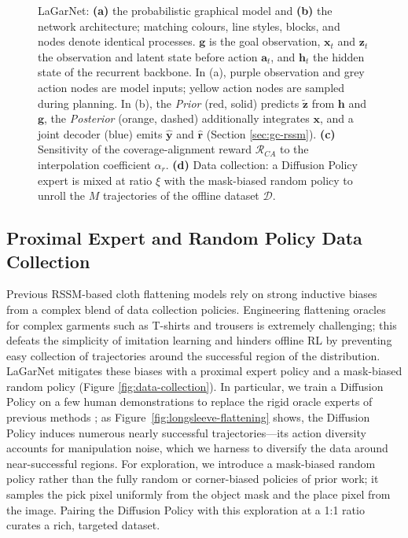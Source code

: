 \documentclass[journal]{IEEEtran}
\newif\ifshowrev\showrevtrue
\newcommand{\rev}[1]{\ifshowrev\textcolor{revblue}{#1}\else#1\fi}
\newif\ifshowrrev\showrrevtrue
\newcommand{\rrev}[1]{\ifshowrrev\textcolor{rrevred}{#1}\else#1\fi}
\begin{document}
\begin{figure}[t!]
    \caption{\rev{LaGarNet: \rrev{\textbf{(a)}} the probabilistic graphical model and \rrev{\textbf{(b)}} the network architecture; matching colours, line styles, blocks, and nodes denote identical processes. $\bm{g}$ is the goal observation, $\bm{x}_t$ and $\bm{z}_t$ the observation and latent state before action $\bm{a}_t$, and $\bm{h}_t$ the hidden state of the recurrent backbone. \rrev{In (a), purple observation and grey action nodes are model inputs; yellow action nodes are sampled during planning. In (b), the \textit{Prior} (red, solid) predicts $\boldsymbol{\tilde{z}}$ from $\boldsymbol{h}$ and $\boldsymbol{g}$, the \textit{Posterior} (orange, dashed) additionally integrates $\boldsymbol{x}$, and a joint decoder (blue) emits $\boldsymbol{\hat{y}}$ and $\boldsymbol{\hat{r}}$ (Section \ref{sec:gc-rssm}).} \rrev{\textbf{(c)}} Sensitivity of the coverage-alignment reward $\mathcal{R}_{CA}$ to the interpolation coefficient $\alpha_r$. \rrev{\textbf{(d)}} Data collection: a Diffusion Policy expert is mixed at ratio \rrev{$\xi$} with the mask-biased random policy to unroll the $M$ trajectories of the offline dataset $\mathcal{D}$.}}
    \label{fig:lagarnet}
\end{figure}

\subsection{Proximal Expert and Random Policy Data Collection} \label{sec:data-collection}

Previous RSSM-based cloth flattening models \cite{kadi2024planet} rely on strong inductive biases from a complex blend of data collection policies. \rev{Engineering flattening oracles for complex garments such as T-shirts and trousers is extremely challenging; this defeats the simplicity of imitation learning and hinders offline RL by preventing easy collection of trajectories around the successful region of the distribution. LaGarNet mitigates these biases with a proximal expert policy and a mask-biased random policy (Figure \ref{fig:data-collection}).} \rev{In particular, we train a Diffusion Policy \cite{chi2023diffusionpolicy} on a few human demonstrations to replace the rigid oracle experts of previous methods \cite{kadi2024planet}; as Figure~\ref{fig:longsleeve-flattening} shows, the Diffusion Policy induces numerous nearly successful trajectories---its action diversity accounts for manipulation noise, which we harness to diversify the data around near-successful regions.} \rev{For exploration, we introduce a mask-biased random policy rather than the fully random or corner-biased policies of prior work; it samples the pick pixel uniformly from the object mask and the place pixel from the image. Pairing the Diffusion Policy with this exploration at a 1:1 ratio curates a rich, targeted dataset.}
\end{document}

